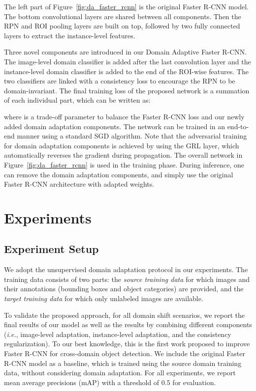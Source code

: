 \documentclass[10pt,twocolumn,letterpaper]{article}
\def\ie{\emph{i.e.}}
\begin{document}
The left part of Figure~\ref{fig:da_faster_rcnn} is the original Faster R-CNN model. The bottom convolutional layers are shared between all components. Then the RPN and ROI pooling layers are built on top, followed by two fully connected layers to extract the instance-level features. 

Three novel components are introduced in our Domain Adaptive Faster R-CNN. The image-level domain classifier is added after the last convolution layer and the instance-level domain classifier is added to the end of the ROI-wise features. The two classifiers are linked with a consistency loss to encourage the RPN to be domain-invariant. The final training loss of the proposed network is a summation of each individual part, which can be written as:


where  is a trade-off parameter to balance the Faster R-CNN loss and our newly added domain adaptation components. The network can be trained in an end-to-end manner using a standard SGD algorithm. Note that the adversarial training for domain adaptation components is achieved by using the GRL layer, which automatically reverses the gradient during propagation. The overall network in Figure~\ref{fig:da_faster_rcnn} is used in the training phase. During inference, one can remove the domain adaptation components, and simply use the original Faster R-CNN architecture with adapted weights. 

\section{Experiments}
\label{sec:exp}
\subsection{Experiment Setup}
We adopt the unsupervised domain adaptation protocol in our experiments. The training data consists of two parts: the \textit{source training data} for which images and their annotations (bounding boxes and object categories) are provided, and the \textit{target training data} for which only unlabeled images are available. 

To validate the proposed approach, for all domain shift scenarios, we report the final results of our model as well as the results by combining different components (\ie, image-level adaptation, instance-level adaptation, and the consistency regularization). To our best knowledge, this is the first work proposed to improve Faster R-CNN for cross-domain object detection. We include the original Faster R-CNN model as a baseline, which is trained using the source domain training data, without considering domain adaptation. For all experiments, we report mean average precisions (mAP) with a threshold of 0.5 for evaluation.
\end{document}
